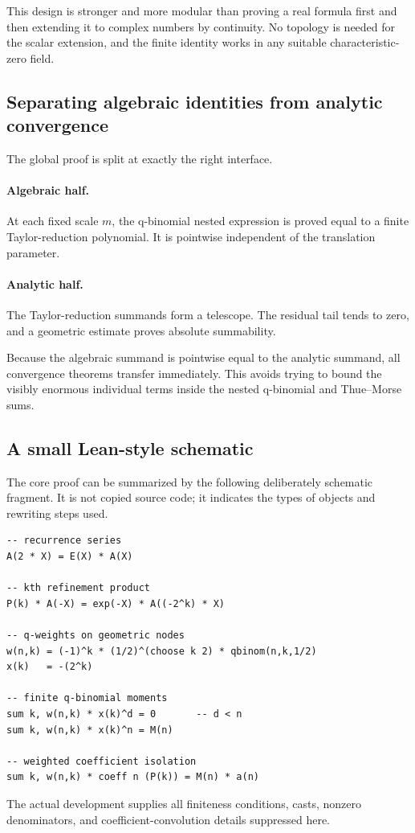\documentclass[11pt,oneside]{article}
\theoremstyle{definition}
\theoremstyle{remark}
\begin{document}
This design is stronger and more modular than proving a real formula first
and then extending it to complex numbers by continuity.  No topology is
needed for the scalar extension, and the finite identity works in any
suitable characteristic-zero field.

\subsection{Separating algebraic identities from analytic convergence}

The global proof is split at exactly the right interface.

\paragraph{Algebraic half.}
At each fixed scale $m$, the q-binomial nested expression is proved equal to
a finite Taylor-reduction polynomial.  It is pointwise independent of the
translation parameter.

\paragraph{Analytic half.}
The Taylor-reduction summands form a telescope.  The residual tail tends to
zero, and a geometric estimate proves absolute summability.

Because the algebraic summand is pointwise equal to the analytic summand,
all convergence theorems transfer immediately.  This avoids trying to bound
the visibly enormous individual terms inside the nested q-binomial and
Thue--Morse sums.

\subsection{A small Lean-style schematic}

The core proof can be summarized by the following deliberately schematic
fragment.  It is not copied source code; it indicates the types of objects
and rewriting steps used.

\begin{lstlisting}
-- recurrence series
A(2 * X) = E(X) * A(X)

-- kth refinement product
P(k) * A(-X) = exp(-X) * A((-2^k) * X)

-- q-weights on geometric nodes
w(n,k) = (-1)^k * (1/2)^(choose k 2) * qbinom(n,k,1/2)
x(k)   = -(2^k)

-- finite q-binomial moments
sum k, w(n,k) * x(k)^d = 0       -- d < n
sum k, w(n,k) * x(k)^n = M(n)

-- weighted coefficient isolation
sum k, w(n,k) * coeff n (P(k)) = M(n) * a(n)
\end{lstlisting}
The actual development supplies all finiteness conditions, casts, nonzero
denominators, and coefficient-convolution details suppressed here.
\end{document}
